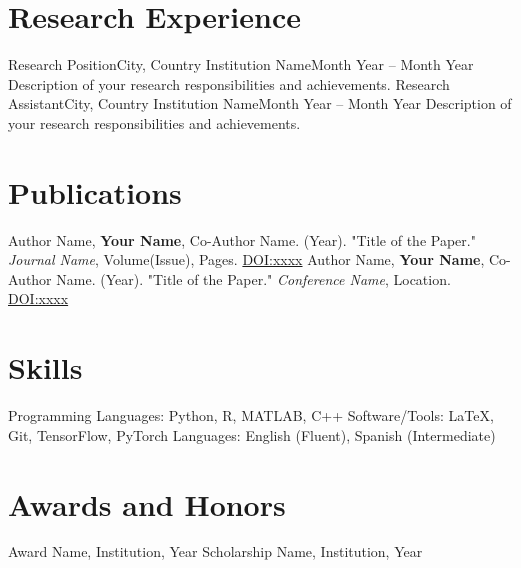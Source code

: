 \section*{Research Experience}
\begin{itemize}[leftmargin=*]
    \resumeEntry
        {Research Position}{City, Country}
        {Institution Name}{Month Year – Month Year}
    \resumeItem
        {Description of your research responsibilities and achievements.}
    \resumeEntry
        {Research Assistant}{City, Country}
        {Institution Name}{Month Year – Month Year}
    \resumeItem
        {Description of your research responsibilities and achievements.}
\end{itemize}

\section*{Publications}
\begin{itemize}[leftmargin=*]
    \resumeItem
        {Author Name, \textbf{Your Name}, Co-Author Name. (Year). "Title of the Paper." \textit{Journal Name}, Volume(Issue), Pages. \href{https://doi.org/xxxx}{DOI:xxxx}}
    \resumeItem
        {Author Name, \textbf{Your Name}, Co-Author Name. (Year). "Title of the Paper." \textit{Conference Name}, Location. \href{https://doi.org/xxxx}{DOI:xxxx}}
\end{itemize}

\section*{Skills}
\begin{itemize}[leftmargin=*]
    \resumeItem
        {Programming Languages: Python, R, MATLAB, C++}
    \resumeItem
        {Software/Tools: LaTeX, Git, TensorFlow, PyTorch}
    \resumeItem
        {Languages: English (Fluent), Spanish (Intermediate)}
\end{itemize}

\section*{Awards and Honors}
\begin{itemize}[leftmargin=*]
    \resumeItem
        {Award Name, Institution, Year}
    \resumeItem
        {Scholarship Name, Institution, Year}
\end{itemize}
